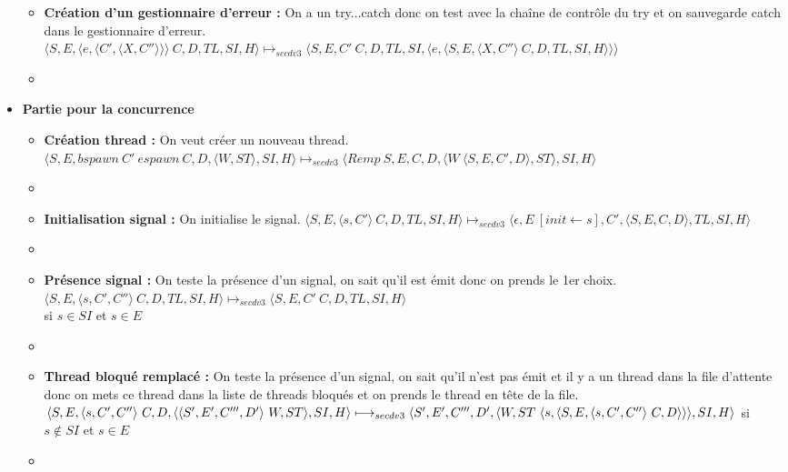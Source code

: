 \documentclass[10pt,a4paper]{article}
\begin{document}
\begin{itemize}
\begin{itemize}
						\item[]  \textbf{Création d'un gestionnaire d'erreur :} On a un try...catch donc on test avec la chaîne de contrôle du try et on sauvegarde catch dans le gestionnaire d'erreur.
						\smallbreak 
						$\langle S,E,\langle e,\langle C',\langle X,C''\rangle\rangle\rangle~C,D,TL,SI,H\rangle \longmapsto_{secdv3} \langle S,E,C'~C,D,TL,SI,\langle e,\langle S,E,\langle X,C''\rangle~C,D,TL,SI,H\rangle\rangle\rangle$
						\item[]
					\end{itemize}
					\item[] \textbf{Partie pour la concurrence}
					\begin{itemize}
						\item[]  \textbf{Création thread :} On veut créer un nouveau thread.
						\smallbreak
						$\langle S,E,bspawn~C'~espawn~C,D,\langle W,ST\rangle,SI,H\rangle \longmapsto_{secdv3} \langle Remp~S,E,C,D,\langle W~\langle S,E,C',D\rangle,ST\rangle,SI,H\rangle$
						\item[]
						
						\item[] \textbf{Initialisation signal :} On initialise le signal.
						\smallbreak
						$\langle S,E,\langle s, C'\rangle~C,D,TL,SI,H\rangle \longmapsto_{secdv3} \langle\epsilon,E~[init \leftarrow s],C',\langle S,E,C,D\rangle,TL,SI,H\rangle$
						\item[]
						
						\item[] \textbf{Présence signal :} On teste la présence d'un signal, on sait qu'il est émit donc on prends le 1er choix.
						\smallbreak
						$\langle S,E,\langle s, C',C''\rangle~C,D,TL,SI,H\rangle \longmapsto_{secdv3} \langle S,E,C'~C,D,TL,SI,H\rangle$ 
						\\si $s \in SI$ et $s \in E$ 
						\item[]
						
						\item[] \textbf{ Thread bloqué remplacé :} On teste la présence d'un signal, on sait qu'il n'est pas émit et il y a un thread dans la file d'attente
						donc on mets ce thread dans la liste de threads bloqués et on prends le thread en tête de la file.
						\smallbreak
						$\langle S,E,\langle s, C',C''\rangle~C,D,\langle\langle S',E',C''',D'\rangle~W,ST\rangle,SI,H\rangle 
						\\\longmapsto_{secdv3} \langle S',E',C''',D',\langle W,ST~\langle s,\langle S,E,\langle s, C',C''\rangle~C,D\rangle\rangle\rangle,SI,H\rangle$ si $s \notin SI$ et $s \in E$ 
						\item[]\newpage
						

\end{itemize}
\end{itemize}
\end{document}
